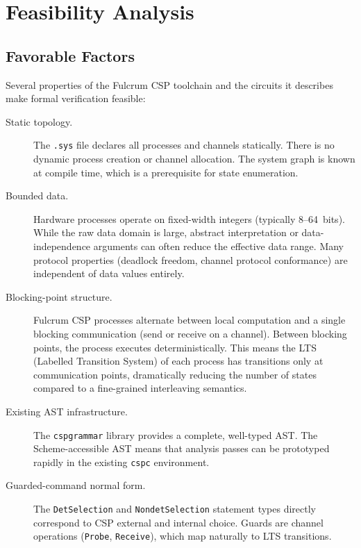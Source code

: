 \documentclass[11pt]{article}
\begin{document}
\section{Feasibility Analysis}

\subsection{Favorable Factors}

Several properties of the Fulcrum CSP toolchain and the circuits it
describes make formal verification feasible:

\begin{description}
\item[Static topology.]
  The \texttt{.sys} file declares all processes and channels
  statically.  There is no dynamic process creation or channel
  allocation.  The system graph is known at compile time, which
  is a prerequisite for state enumeration.

\item[Bounded data.]
  Hardware processes operate on fixed-width integers (typically
  8--64~bits).  While the raw data domain is large, abstract
  interpretation or data-independence arguments can often reduce
  the effective data range.  Many protocol properties (deadlock
  freedom, channel protocol conformance) are independent of data
  values entirely.

\item[Blocking-point structure.]
  Fulcrum CSP processes alternate between local computation and a
  single blocking communication (send or receive on a channel).
  Between blocking points, the process executes deterministically.
  This means the LTS (Labelled Transition System) of each process
  has transitions only at communication points, dramatically reducing
  the number of states compared to a fine-grained interleaving
  semantics.

\item[Existing AST infrastructure.]
  The \texttt{cspgrammar} library provides a complete, well-typed
  AST.  The Scheme-accessible AST means that analysis passes can be
  prototyped rapidly in the existing \texttt{cspc} environment.

\item[Guarded-command normal form.]
  The \texttt{DetSelection} and \texttt{NondetSelection} statement
  types directly correspond to CSP external and internal choice.
  Guards are channel operations (\texttt{Probe}, \texttt{Receive}),
  which map naturally to LTS transitions.
\end{description}
\end{document}
